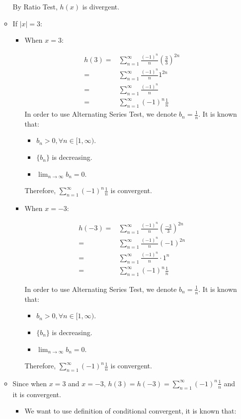 \documentclass[12pt]{exam}
\begin{document}
\begin{enumerate}
\begin{itemize}
	By Ratio Test, $h(x)$ is divergent.

	\item If $|x| = 3$:

	\begin{itemize}
		\item When $x = 3$:

		\begin{align*}
			h(3)
			=& \sum_{n = 1}^{\infty} \frac{(-1)^n}{n}({\frac{3}{3}})^{2n}\\
			=& \sum_{n = 1}^{\infty} \frac{(-1)^n}{n}1^{2n} \\
			=& \sum_{n = 1}^{\infty} \frac{(-1)^n}{n} \\
			=& \sum_{n = 1}^{\infty} (-1)^n\frac{1}{n}
		\end{align*}
		In order to use Alternating Series Test, we denote $b_n = \frac{1}{n}$. It is known that:
		\begin{itemize}
			\item $b_n > 0, \forall n\in[1, \infty)$.
			\item $\{b_n\}$ is decreasing.
			\item $\lim_{n \to \infty} b_n = 0$.
		\end{itemize}
		
		Therefore, $\sum_{n = 1}^{\infty} (-1)^n \frac{1}{n}$ is convergent.
		
		\item When $x = -3$:

		\begin{align*}
			h(-3)
			=& \sum_{n = 1}^{\infty} \frac{(-1)^n}{n}({\frac{-3}{3}})^{2n}\\
			=& \sum_{n = 1}^{\infty} \frac{(-1)^n}{n}(-1)^{2n} \\
			=& \sum_{n = 1}^{\infty} \frac{(-1)^n}{n}\cdot1^n \\
			=& \sum_{n = 1}^{\infty} (-1)^n\frac{1}{n}
		\end{align*}

		In order to use Alternating Series Test, we denote $b_n = \frac{1}{n}$. It is known that:
		\begin{itemize}
			\item $b_n > 0, \forall n\in[1, \infty)$.
			\item $\{b_n\}$ is decreasing.
			\item $\lim_{n \to \infty} b_n = 0$.
		\end{itemize}
		

		Therefore, $\sum_{n = 1}^{\infty} (-1)^n \frac{1}{n}$ is convergent.
	\end{itemize}
	\item Since when $x = 3$ and $x=-3$, $h(3)=h(-3)=\sum_{n = 1}^{\infty} (-1)^n\frac{1}{n}$ and it is convergent.
	\begin{itemize}
	    \item We want to use definition of conditional convergent, it is known that:
	    

\end{itemize}
\end{itemize}
\end{enumerate}
\end{document}
